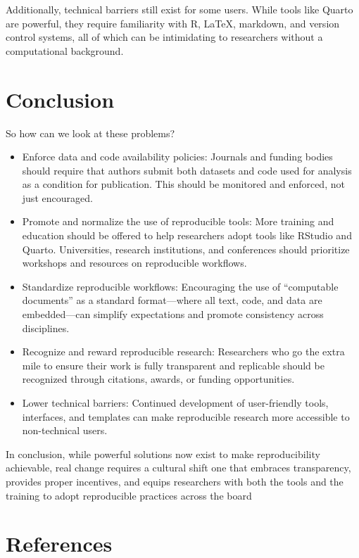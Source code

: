 \documentclass[
  a4paper,
]{article}
\providecommand{\tightlist}{%
  \setlength{\itemsep}{0pt}\setlength{\parskip}{0pt}}\usepackage{longtable,booktabs,array}
\begin{document}
Additionally, technical barriers still exist for some users. While tools
like Quarto are powerful, they require familiarity with R, LaTeX,
markdown, and version control systems, all of which can be intimidating
to researchers without a computational background.

\section{Conclusion}\label{conclusion}

So how can we look at these problems?

\begin{itemize}
\tightlist
\item
  Enforce data and code availability policies: Journals and funding
  bodies should require that authors submit both datasets and code used
  for analysis as a condition for publication. This should be monitored
  and enforced, not just encouraged.
\item
  Promote and normalize the use of reproducible tools: More training and
  education should be offered to help researchers adopt tools like
  RStudio and Quarto. Universities, research institutions, and
  conferences should prioritize workshops and resources on reproducible
  workflows.
\item
  Standardize reproducible workflows: Encouraging the use of
  ``computable documents'' as a standard format---where all text, code,
  and data are embedded---can simplify expectations and promote
  consistency across disciplines.
\item
  Recognize and reward reproducible research: Researchers who go the
  extra mile to ensure their work is fully transparent and replicable
  should be recognized through citations, awards, or funding
  opportunities.
\item
  Lower technical barriers: Continued development of user-friendly
  tools, interfaces, and templates can make reproducible research more
  accessible to non-technical users.
\end{itemize}

In conclusion, while powerful solutions now exist to make
reproducibility achievable, real change requires a cultural shift one
that embraces transparency, provides proper incentives, and equips
researchers with both the tools and the training to adopt reproducible
practices across the board

\section{References}\label{references}
\end{document}
